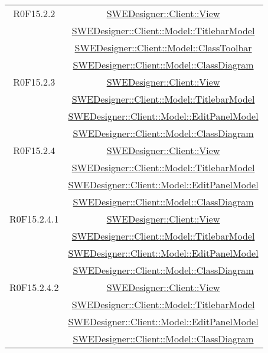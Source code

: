 \documentclass[../SpecificaTecnica.tex]{subfiles}
\begin{document}
\begin{longtable}{|c|c|}
		R0F15.2.2 & \hyperlink{SWEDesigner::Client::View}{SWEDesigner::Client::View}\\& \hyperlink{SWEDesigner::Client::Model::TitlebarModel}{SWEDesigner::Client::Model::TitlebarModel}\\& \hyperlink{SWEDesigner::Client::Model::ClassToolbar}{SWEDesigner::Client::Model::ClassToolbar}\\& \hyperlink{SWEDesigner::Client::Model::ClassDiagram}{SWEDesigner::Client::Model::ClassDiagram}\\\hline
		R0F15.2.3 & \hyperlink{SWEDesigner::Client::View}{SWEDesigner::Client::View}\\& \hyperlink{SWEDesigner::Client::Model::TitlebarModel}{SWEDesigner::Client::Model::TitlebarModel}\\& \hyperlink{SWEDesigner::Client::Model::EditPanelModel}{SWEDesigner::Client::Model::EditPanelModel}\\& \hyperlink{SWEDesigner::Client::Model::ClassDiagram}{SWEDesigner::Client::Model::ClassDiagram}\\\hline
		R0F15.2.4 & \hyperlink{SWEDesigner::Client::View}{SWEDesigner::Client::View}\\& \hyperlink{SWEDesigner::Client::Model::TitlebarModel}{SWEDesigner::Client::Model::TitlebarModel}\\& \hyperlink{SWEDesigner::Client::Model::EditPanelModel}{SWEDesigner::Client::Model::EditPanelModel}\\& \hyperlink{SWEDesigner::Client::Model::ClassDiagram}{SWEDesigner::Client::Model::ClassDiagram}\\\hline
		R0F15.2.4.1 & \hyperlink{SWEDesigner::Client::View}{SWEDesigner::Client::View}\\& \hyperlink{SWEDesigner::Client::Model::TitlebarModel}{SWEDesigner::Client::Model::TitlebarModel}\\& \hyperlink{SWEDesigner::Client::Model::EditPanelModel}{SWEDesigner::Client::Model::EditPanelModel}\\& \hyperlink{SWEDesigner::Client::Model::ClassDiagram}{SWEDesigner::Client::Model::ClassDiagram}\\\hline
		R0F15.2.4.2 & \hyperlink{SWEDesigner::Client::View}{SWEDesigner::Client::View}\\& \hyperlink{SWEDesigner::Client::Model::TitlebarModel}{SWEDesigner::Client::Model::TitlebarModel}\\& \hyperlink{SWEDesigner::Client::Model::EditPanelModel}{SWEDesigner::Client::Model::EditPanelModel}\\& \hyperlink{SWEDesigner::Client::Model::ClassDiagram}{SWEDesigner::Client::Model::ClassDiagram}\\\hline

\end{longtable}
\end{document}
